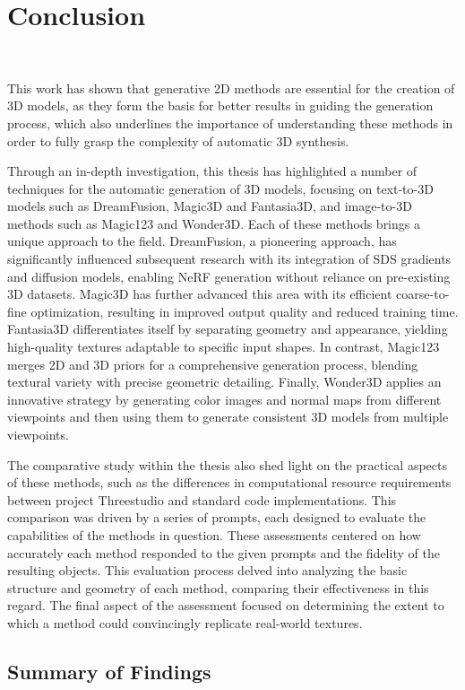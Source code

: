 \chapter{Conclusion}~\label{ch:conclusion}

This work has shown that generative 2D methods are essential for the creation of 3D models, as they form the basis for better results in guiding the generation process, which also underlines the importance of understanding these methods in order to fully grasp the complexity of automatic 3D synthesis.

Through an in-depth investigation, this thesis has highlighted a number of techniques for the automatic generation of 3D models, focusing on text-to-3D models such as DreamFusion, Magic3D and Fantasia3D, and image-to-3D methods such as Magic123 and Wonder3D. Each of these methods brings a unique approach to the field. DreamFusion, a pioneering approach, has significantly influenced subsequent research with its integration of SDS gradients and diffusion models, enabling NeRF generation without reliance on pre-existing 3D datasets. Magic3D has further advanced this area with its efficient coarse-to-fine optimization, resulting in improved output quality and reduced training time. Fantasia3D differentiates itself by separating geometry and appearance, yielding high-quality textures adaptable to specific input shapes. In contrast, Magic123 merges 2D and 3D priors for a comprehensive generation process, blending textural variety with precise geometric detailing. Finally, Wonder3D applies an innovative strategy by generating color images and normal maps from different viewpoints and then using them to generate consistent 3D models from multiple viewpoints.

The comparative study within the thesis also shed light on the practical aspects of these methods, such as the differences in computational resource requirements between project Threestudio and standard code implementations. This comparison was driven by a series of prompts, each designed to evaluate the capabilities of the methods in question. These assessments centered on how accurately each method responded to the given prompts and the fidelity of the resulting objects. This evaluation process delved into analyzing the basic structure and geometry of each method, comparing their effectiveness in this regard. The final aspect of the assessment focused on determining the extent to which a method could convincingly replicate real-world textures.

\section{Summary of Findings}

